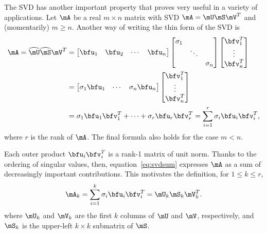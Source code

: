 The SVD has another important property that proves very useful in a variety of applications. Let $\mA$ be a real $m\times n$ matrix with SVD $\mA=\mU\mS\mV^T$ and (momentarily) $m\ge n$. Another way of writing the thin form of the SVD is
\begin{align}
  \mA = \widehat{\mU}\widehat{\mS}\mV^T &=
  \begin{bmatrix}
    \bfu_1 & \bfu_2 & \cdots & \bfu_n
  \end{bmatrix}
  \begin{bmatrix}
    \sigma_1 & & \\
    & \ddots & \\
    & & \sigma_n
  \end{bmatrix}
        \begin{bmatrix}
          \bfv_1^T \\ \vdots \\ \bfv_n^T
        \end{bmatrix}  \notag \\
  &=
  \begin{bmatrix}
    \sigma_1\bfu_1  & \cdots & \sigma_n\bfu_n
  \end{bmatrix}
                               \begin{bmatrix}
                                  \bfv_1^T \\ \vdots \\ \bfv_n^T
                               \end{bmatrix} \notag \\
  \label{eq:svdsum}
  &= \sigma_1 \bfu_{1}\bfv_{1}^T + \cdots + \sigma_r \bfu_{r}\bfv_{r}^T = \sum_{i=1}^r \sigma_i \bfu_{i}\bfv_{i}^T,
\end{align}
where $r$ is the rank of $\mA$. The final formula also holds for the case $m<n$.

Each outer product $\bfu_{i}\bfv_{i}^T$ is a rank-1 matrix of unit norm. Thanks to the ordering of singular values, then, equation~\eqref{eq:svdsum} expresses $\mA$ as a sum of decreasingly important contributions. This motivates the definition, for $1\le k \le r$,
\begin{equation}
  \label{eq:svdlowrank}
  \mA_k = \sum_{i=1}^k \sigma_i \bfu_{i}\bfv_{i}^T = \mU_k \mS_k \mV_k^T.
\end{equation}
where $\mU_k$ and $\mV_k$ are the first $k$
columns of $\mU$ and $\mV$, respectively, and $\mS_k$ is the upper-left $k\times k$
submatrix of $\mS$.

